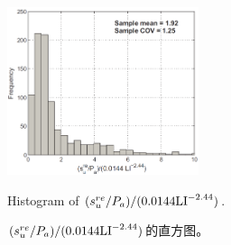 \begin{figure}[!htb]
    \centering
    \includegraphics[width=0.5\textwidth]{figures/figure-15.png}
    \caption{Histogram of $(s_u^{re}/P_a)/(0.0144\rm{LI}^{-2.44})$.}
    \addtocounter{figure}{-1}
    \vspace{-5pt}
    \renewcommand{\figurename}{图}
    \caption{$(s_u^{re}/P_a)/(0.0144\rm{LI}^{-2.44})$的直方图。}
    \renewcommand{\figurename}{Figure}
    \label{figure:15}
\end{figure}